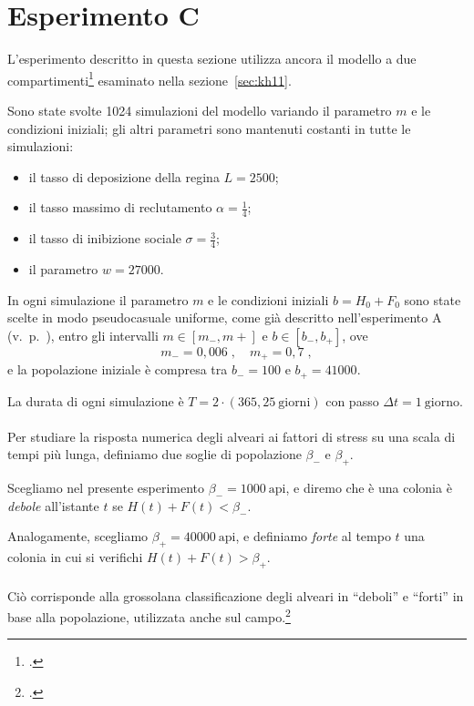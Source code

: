 \section{Esperimento C}
L'esperimento descritto in questa sezione utilizza ancora il modello a due compartimenti\footcite{khoury2011}
esaminato nella sezione~\ref{sec:kh11}.

Sono state svolte 1024 simulazioni del modello variando il parametro $m$ e le condizioni iniziali;
gli altri parametri sono mantenuti costanti in tutte le simulazioni:
\begin{itemize}
    \item il tasso di deposizione della regina $L=2500$;
    \item il tasso massimo di reclutamento $\alpha = \frac{1}{4}$;
    \item il tasso di inibizione sociale $\sigma = \frac{3}{4}$;
    \item il parametro $w=27000$.
\end{itemize}

In ogni simulazione il parametro $m$ e le condizioni iniziali $b = H_0 + F_0$ sono state scelte
in modo pseudocasuale uniforme, come già descritto nell'esperimento A (v.~p.~\pageref{sec:esperimentoA}),
entro gli intervalli $m \in \left[ m_-, m+ \right]$ e $b \in \left[b_-, b_+ \right]$, ove
$$m_- =0,006 \; , \quad m_+ = 0,7 \; ,$$
e la popolazione iniziale è compresa tra $b_- =100$ e $b_+=41000$.

La durata di ogni simulazione è $T=2 \cdot (365,25~\text{giorni})$ con passo $\Delta t = 1~\text{giorno}$.

\paragraph{}
Per studiare la risposta numerica degli alveari ai fattori di stress su una scala di tempi più lunga,
definiamo due soglie di popolazione $\beta_-$ e $\beta_+$.

Scegliamo nel presente esperimento $\beta_- = 1000~\text{api}$, e diremo che è una colonia è \emph{debole}
all'istante $t$ se $H(t)+F(t)< \beta_-$.

Analogamente, scegliamo $\beta_+ = 40000~\text{api}$, e definiamo \emph{forte} al tempo $t$ una colonia in cui
si verifichi $H(t)+F(t)> \beta_+$.

\paragraph{}
Ciò corrisponde alla grossolana classificazione degli alveari in ``deboli'' e ``forti'' in base alla popolazione,
utilizzata anche sul campo.\footcite{privFDL,tesiFDL,meccanica}

